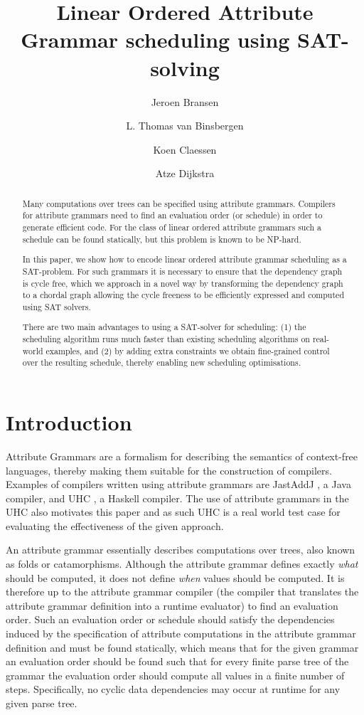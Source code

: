 \documentclass{llncs}
\title{Linear Ordered Attribute Grammar scheduling using SAT-solving}
\author{Jeroen Bransen\inst{1}  \and L. Thomas van Binsbergen\inst{2,1} \and Koen Claessen\inst{3} \and Atze Dijkstra\inst{1}}
\institute{Utrecht University, Utrecht, The Netherlands, \email{\{J.Bransen,atze\}@uu.nl}
\and Royal Holloway, University of London, Egham, UK, \email{Thomas.VanBinsbergen.2014@live.rhul.ac.uk}
\and Chalmers University of Technology, Gothenburg, Sweden, \email{koen@chalmers.se}}
\begin{document}
\maketitle

\begin{abstract}
Many computations over trees can be specified using attribute
grammars. Compilers for attribute grammars need to find an evaluation
order (or schedule) in order to generate efficient code. For the class
of linear ordered attribute grammars such a schedule can be found
statically, but this problem is known to be NP-hard.

In this paper, we show how to encode linear ordered attribute grammar
scheduling as a SAT-problem. For such grammars it is necessary to ensure that the dependency graph is cycle free, which we approach in a novel way by transforming the dependency graph to a chordal graph allowing the cycle freeness to be efficiently expressed and computed using SAT solvers.

There are two main advantages to using a SAT-solver for scheduling:
(1) the scheduling algorithm runs much faster than existing scheduling
algorithms on real-world examples, and (2) by adding extra constraints
we obtain fine-grained control over the resulting schedule, thereby
enabling new scheduling optimisations.


\end{abstract}

\section{Introduction}
Attribute Grammars \cite{knuth68} are a formalism for describing the semantics of context-free languages, thereby making them suitable for the construction of compilers. Examples of compilers written using attribute grammars are JastAddJ \cite{Ekman:2007}, a Java compiler, and UHC \cite{Dijkstra:2009}, a Haskell compiler. The use of attribute grammars in the UHC also motivates this paper and as such UHC is a real world test case for evaluating the effectiveness of the given approach.

An attribute grammar essentially describes computations over trees, also known as folds or catamorphisms. Although the attribute grammar defines exactly \emph{what} should be computed, it does not define \emph{when} values should be computed. It is therefore up to the attribute grammar compiler (the compiler that translates the attribute grammar definition into a runtime evaluator) to find an evaluation order. Such an evaluation order or schedule should satisfy the dependencies induced by the specification of attribute computations in the attribute grammar definition and must be found statically, which means that for the given grammar an evaluation order should be found such that for every finite parse tree of the grammar the evaluation order should compute all values in a finite number of steps. Specifically, no cyclic data dependencies may occur at runtime for any given parse tree.
\end{document}
